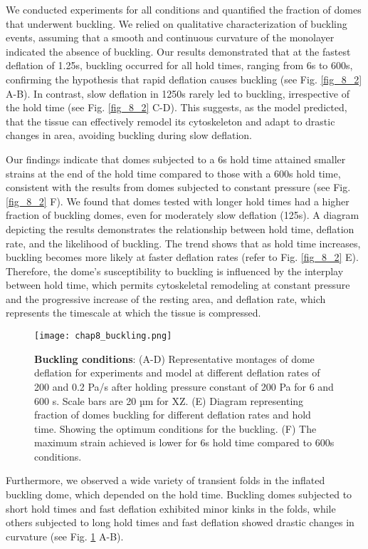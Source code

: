 We conducted experiments for all conditions and quantified the fraction of domes that underwent buckling. We relied on qualitative characterization of buckling events, assuming that a smooth and continuous curvature of the monolayer indicated the absence of buckling. Our results demonstrated that at the fastest deflation of 1.25s, buckling occurred for all hold times, ranging from 6s to 600s, confirming the hypothesis that rapid deflation causes buckling (see Fig. \ref{fig_8_2} A-B). In contrast, slow deflation in 1250s rarely led to buckling, irrespective of the hold time (see Fig. \ref{fig_8_2} C-D). This suggests, as the model predicted, that the tissue can effectively remodel its cytoskeleton and adapt to drastic changes in area, avoiding buckling during slow deflation.

Our findings indicate that domes subjected to a 6s hold time attained smaller strains at the end of the hold time compared to those with a 600s hold time, consistent with the results from domes subjected to constant pressure (see Fig. \ref{fig_8_2} F). We found that domes tested with longer hold times had a higher fraction of buckling domes, even for moderately slow deflation (125s). A  diagram depicting the results demonstrates the relationship between hold time, deflation rate, and the likelihood of buckling. The trend shows that as hold time increases, buckling becomes more likely at faster deflation rates (refer to Fig. \ref{fig_8_2} E). Therefore, the dome's susceptibility to buckling is influenced by the interplay between hold time, which permits cytoskeletal remodeling at constant pressure and the progressive increase of the resting area, and deflation rate, which represents the timescale at which the tissue is compressed.

\begin{figure}[b!]
	\centering
	\texttt{[image: chap8\_buckling.png]}
	\caption{\label{fig_8_3} \textbf{Buckling conditions}: (A-D) Representative montages of dome deflation for experiments and model at different deflation rates of 200 and 0.2 Pa/s after holding pressure constant of 200 Pa for 6 and 600 s. Scale bars are 20 µm for XZ. (E) Diagram representing fraction of domes buckling for different deflation rates and hold time. Showing the optimum conditions for the buckling. (F) The maximum strain achieved is lower for 6s hold time compared to 600s conditions.}
\end{figure}

Furthermore, we observed a wide variety of transient folds in the inflated buckling dome, which depended on the hold time. Buckling domes subjected to short hold times and fast deflation exhibited minor kinks in the folds, while others subjected to long hold times and fast deflation showed drastic changes in curvature (see Fig. \ref{fig_8_3} A-B).

